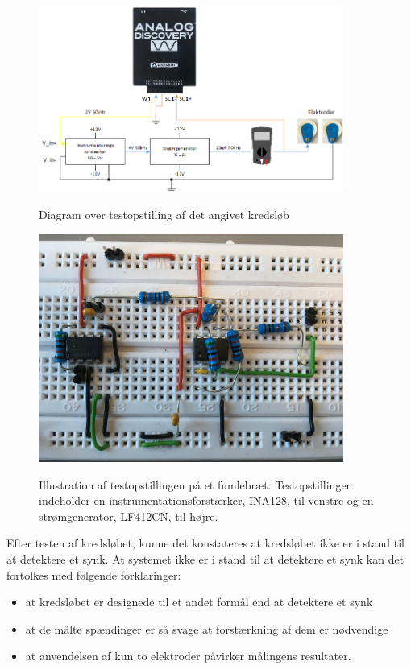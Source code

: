 \begin{figure}[H]
\centering
{\includegraphics[width=10cm]
{Figure/testopstilling11}}
\caption{Diagram over testopstilling af det angivet kredsløb}
\label{fig:testopstilling1}
\end{figure} 



\begin{figure}[H]
\centering
{\includegraphics[width=10cm]
{Figure/oprindeligekredslob2}}
\caption{Illustration af testopstillingen på et fumlebræt. Testopstillingen indeholder en instrumentationsforstærker, INA128, til venstre og en strømgenerator, LF412CN, til højre.}
\label{fig:celler}
\end{figure}

Efter testen af kredsløbet, kunne det konstateres at kredsløbet ikke er i stand til at detektere et synk.  At systemet ikke er i stand til at detektere et synk kan det fortolkes med følgende forklaringer:


 
\begin{itemize}
\item at kredsløbet er designede til et andet formål end at detektere et synk
\item at de målte spændinger er så svage at forstærkning af dem er nødvendige
\item at anvendelsen af kun to elektroder påvirker målingens resultater.  
\end{itemize}

